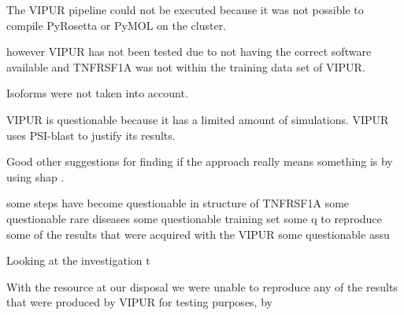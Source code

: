 The VIPUR pipeline could not be executed because it was not possible to compile PyRosetta or PyMOL on the cluster.

however VIPUR has not been tested due to not having the correct software available and TNFRSF1A was not within the training data set of VIPUR. 

Isoforms were not taken into account.


VIPUR is questionable because it has a limited amount of simulations.
VIPUR uses PSI-blast to justify its results.

Good other suggestions for finding if the approach really means something is by using shap \cite{}.


 some steps have become questionable in structure of TNFRSF1A some questionable  rare diseases  some questionable  training set some q to reproduce some of the results that were acquired with the VIPUR some questionable assu


Looking at the investigation t

With the resource at our disposal we were unable to reproduce any of the results that were produced by VIPUR for testing purposes, by 